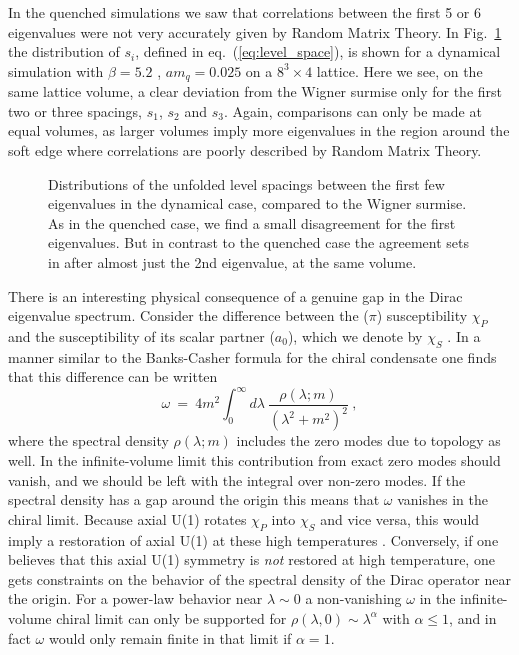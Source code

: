 \documentclass[11pt]{article}
\newcommand{\beq}{\begin{equation}}
\newcommand{\eeq}{\end{equation}}
\newcommand{\noi}{\vspace{12pt}\noindent}
\begin{document}
\noi 
In the quenched simulations we saw that correlations between the
first 5 or 6 eigenvalues were not very accurately given by Random Matrix
Theory.  In
Fig.~\ref{fig:d_level_space} the distribution of $s_i$, defined in
eq.~(\ref{eq:level_space}), is shown for a dynamical simulation with
$\beta=5.2$ , $am_q=0.025$ on a $8^3\times4$ lattice.  
Here we see, on the same lattice volume, 
a clear deviation from the Wigner surmise
only for the first two or three spacings, $s_1$, $s_2$ and $s_3$. Again,
comparisons can only be made at equal volumes, as larger volumes imply
more eigenvalues in the region around the soft edge where correlations
are poorly described by Random Matrix Theory.

\begin{figure}
\begin{center}
\textwidth
{}
\end{center}
\vspace*{-2mm}
\caption[a]{Distributions of the unfolded level spacings between the
first few eigenvalues in the dynamical case, compared to the Wigner surmise.
As in the quenched case, we find a small disagreement for the first
eigenvalues. But in contrast to the quenched case the agreement sets
in after almost just the 2nd eigenvalue, at the same volume.}
\label{fig:d_level_space}
\end{figure}

\noi
There is an interesting physical consequence of a genuine gap in
the Dirac eigenvalue spectrum. Consider the difference between the
($\pi$) susceptibility $\chi_P$ and the susceptibility of its scalar 
partner ($a_0$), which we denote by $\chi_S$ \cite{B,C}. In a manner similar
to the Banks-Casher formula for the chiral condensate one finds that
this difference can be written
\beq
\omega ~=~ 4m^2 \int_0^{\infty} \! d\lambda ~\frac{\rho(\lambda;m)}{
(\lambda^2+ m^2)^2} ~,
\eeq
where the spectral density $\rho(\lambda;m)$ includes the zero modes
due to topology as well. In the infinite-volume limit this contribution
from exact zero modes should vanish, and we should be left with the
integral over non-zero modes. If the spectral density has a gap around
the origin this means that $\omega$ vanishes in the chiral limit. Because
axial U(1) rotates $\chi_P$ into $\chi_S$ and vice versa, this would
imply a restoration of axial U(1) at these high temperatures \cite{B,C}.
Conversely, if one believes that this axial U(1) symmetry is {\em not}
restored at high temperature, one gets constraints on the behavior of
the spectral density of the Dirac operator near the origin. For a power-law
behavior near $\lambda \sim 0$ a non-vanishing $\omega$ in the
infinite-volume chiral limit can only be supported for $\rho(\lambda,0)
\sim \lambda^{\alpha}$ with $\alpha \leq 1$, and in fact $\omega$ would
only remain finite in that limit if $\alpha = 1$.
 
\end{document}
